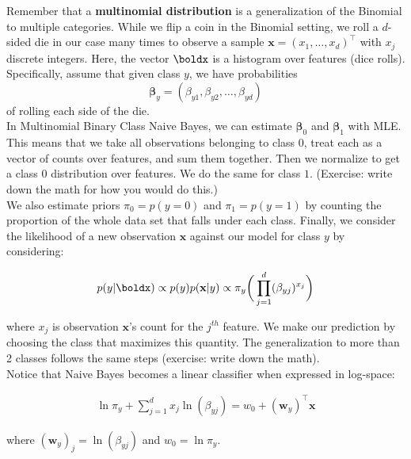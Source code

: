 \documentclass[12pt,letterpaper]{article}
\newcommand{\1}{\mathbbm{1}}
\begin{document}
\noindent 
Remember that a \textbf{multinomial distribution} is a generalization of the Binomial to multiple categories. While we flip a coin in the Binomial setting, we roll a $d$-sided die in our case many times to observe a sample $\mathbf{x} = (x_1, \ldots, x_d)^\top$ with $x_j$ discrete integers. Here, the vector $\boldx$ is a histogram over features (dice rolls).\\

\noindent
Specifically, assume that given class $y$, we have probabilities $$\boldsymbol{\beta}_y = (\beta_{y1}, \beta_{y2}, \ldots , \beta_{yd})$$
of rolling each side of the die. \\


\noindent 
In Multinomial Binary Class Naive Bayes, we can estimate $\boldsymbol{\beta}_0$ and $\boldsymbol{\beta}_1$ with MLE. This means that we take all observations belonging to class $0$, treat each as a vector of counts over features, and sum them together. Then we normalize to get a class $0$ distribution over features. We do the same for class $1$. (Exercise: write down the math for how you would do this.) \\

\noindent
We also estimate priors $\pi_0 = p(y = 0)$ and $\pi_1 = p(y = 1)$ by counting the proportion of the whole data set that falls under each class. Finally, we consider the likelihood of a new observation $\mathbf{x}$ against our model for class $y$ by considering:

\begin{align}
p(y | \boldx) \propto p(y)p(\mathbf{x}|y) \propto \pi_y \bigg(\prod_{j=1}^d (\beta_{yj})^{x_j}\bigg)
\end{align}

\noindent
where $x_j$ is observation $\mathbf{x}$'s count for the $j^{th}$ feature. We make our prediction by choosing the class that maximizes this quantity. The generalization to more than 2 classes follows the same steps (exercise: write down the math). \\

\noindent Notice that Naive Bayes becomes a linear classifier when expressed in log-space:

\begin{align}
\ln \pi_y + \sum_{j=1}^dx_j \ln(\beta_{yj}) = w_0 +  (\mathbf{w}_y)^\top\mathbf{x}
\end{align}

\noindent 
where $(\mathbf{w}_y)_j = \ln(\beta_{yj})$ and $w_0 = \ln \pi_y$.\\
\end{document}
